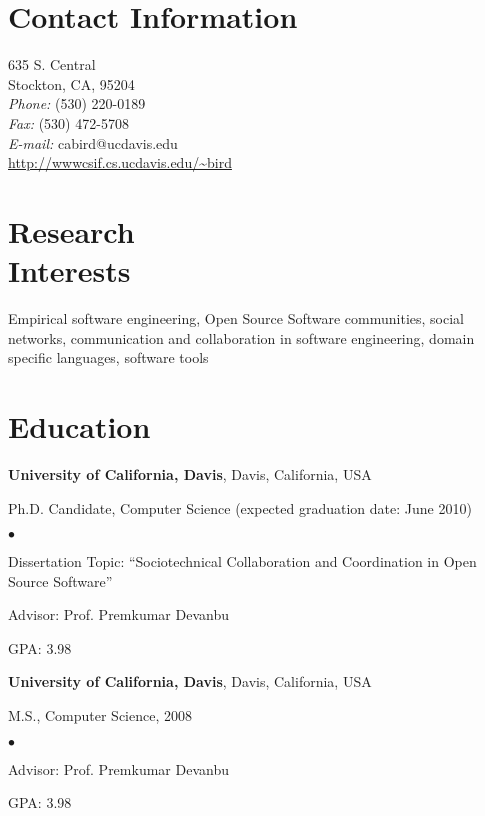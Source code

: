 \documentclass[margin,line,article]{res}
\newenvironment{list1}{
  \begin{list}{}{%
      \setlength{\itemsep}{0in}
      \setlength{\parsep}{0in} \setlength{\parskip}{0in}
      \setlength{\topsep}{0in} \setlength{\partopsep}{0in} 
      \setlength{\leftmargin}{0.17in}}}{\end{list}}
\newenvironment{list2}{
  \begin{list}{$\bullet$}{%
      \setlength{\itemsep}{0in}
      \setlength{\parsep}{0in} \setlength{\parskip}{0in}
      \setlength{\topsep}{0in} \setlength{\partopsep}{0in} 
      \setlength{\leftmargin}{0.2in}}}{\end{list}}
\begin{document}



\begin{resume}
\section{Contact Information}
\vspace{.05in}
635 S. Central\\
Stockton, CA, 95204\\
{\it Phone:}  (530) 220-0189 \\
{\it Fax:}    (530) 472-5708 \\
{\it E-mail:}  cabird@ucdavis.edu\\
\url{http://wwwcsif.cs.ucdavis.edu/~bird}
 
\section{Research \\
Interests}
Empirical software engineering, Open Source Software communities, social networks, 
communication and collaboration in software engineering, 
domain specific languages, software tools

\section{Education}
\textbf{University of California, Davis}, Davis, California, USA
\begin{list1}
\item Ph.D. Candidate, Computer Science (expected
  graduation date: June 2010)
\begin{list2}
\vspace*{.05in}
\item Dissertation Topic:  ``Sociotechnical Collaboration and Coordination in Open Source Software'' 
\item Advisor:  Prof. Premkumar Devanbu
\item GPA: 3.98
\end{list2}
\end{list1}

\textbf{University of California, Davis}, Davis, California, USA
\begin{list1}
\item M.S., Computer Science, 2008
\begin{list2}
\vspace*{.05in}
\item Advisor:  Prof. Premkumar Devanbu
\item GPA: 3.98
\end{list2}
\end{list1}


\end{resume}
\end{document}
